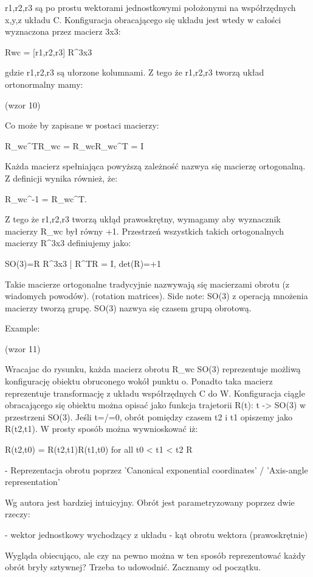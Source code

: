 r1,r2,r3 są po prostu wektorami jednostkowymi położonymi na współrzędnych x,y,z układu C. Konfiguracja obracającego się układu jest wtedy w całości wyznaczona przez macierz 3x3:

Rwc = [r1,r2,r3] \in R^3x3 

gdzie r1,r2,r3 są ułorzone kolumnami. Z tego że r1,r2,r3 tworzą układ ortonormalny mamy:

(wzor 10)

Co może by zapisane w postaci macierzy:

R_wc^TR_wc = R_wcR_wc^T = I

Każda macierz spełniająca powyższą zależność nazwya się macierzę ortogonalną. Z definicji wynika również, że:

R_wc^-1 = R_wc^T. 

Z tego że r1,r2,r3 tworzą ukłąd prawoskrętny, wymagamy aby wyznacznik macierzy R_wc był równy +1. Przestrzeń wszystkich takich ortogonalnych macierzy \in R^3x3 definiujemy jako:

SO(3)={R \in R^3x3 | R^TR = I, det(R)=+1}

Takie macierze ortogonalne tradycyjnie nazwywają się macierzami obrotu (z wiadomych powodów). (rotation matrices). Side note: SO(3) z operacją mnożenia macierzy tworzą grupę. SO(3) nazwya się czasem grupą obrotową. 

Example:

(wzor 11)

Wracajac do rysunku, każda macierz obrotu R_wc \in SO(3) reprezentuje możliwą konfigurację obiektu obruconego wokół punktu o. Ponadto taka macierz reprezentuje transformację z układu współrzędnych C do W. Konfiguracja ciągle obracającego się obiektu można opisać jako funkcja trajetorii R(t): t -> SO(3) w przestrzeni SO(3). Jeśli t=/=0, obrót pomiędzy czasem t2 i t1 opiszemy jako R(t2,t1). W prosty sposób można wywnioskować iż:

R(t2,t0) = R(t2,t1)R(t1,t0) for all t0 < t1 < t2 \in R

- Reprezentacja obrotu poprzez 'Canonical exponential coordinates' / 'Axis-angle representation'

Wg autora jest bardziej intuicyjny. Obrót jest parametryzowany poprzez dwie rzeczy:

- wektor jednostkowy wychodzący z układu
- kąt obrotu wektora (prawoskrętnie)

Wygląda obiecująco, ale czy na pewno można w ten sposób reprezentować każdy obrót bryły sztywnej? Trzeba to udowodnić. Zacznamy od początku.

